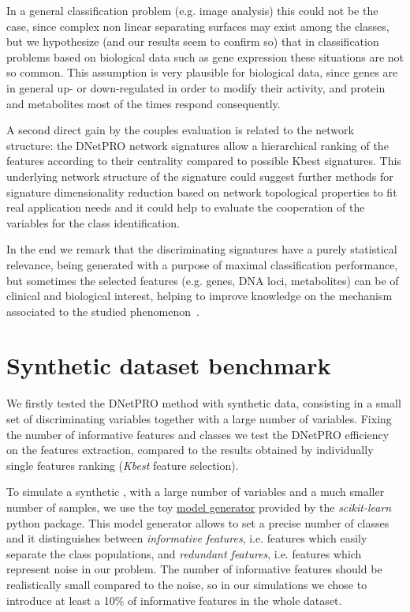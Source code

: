 \documentclass{standalone}
\begin{document}
In a general classification problem (e.g. image analysis) this could not be the case, since complex non linear separating surfaces may exist among the classes, but we hypothesize (and our results seem to confirm so) that in classification problems based on biological data such as gene expression these situations are not so common.
This assumption is very plausible for biological data, since genes are in general up- or down-regulated in order to modify their activity, and protein and metabolites most of the times respond consequently.

A second direct gain by the couples evaluation is related to the network structure: the DNetPRO network signatures allow a hierarchical ranking of the features according to their centrality compared to possible Kbest signatures.
This underlying network structure of the signature could suggest further methods for signature dimensionality reduction based on network topological properties to fit real application needs and it could help to evaluate the cooperation of the variables for the class identification.

In the end we remark that the discriminating signatures have a purely statistical relevance, being generated with a purpose of maximal classification performance, but sometimes the selected features (e.g. genes, DNA loci, metabolites) can be of clinical and biological interest, helping to improve knowledge on the mechanism associated to the studied phenomenon~\cite{PMrna, Scotlandi2009, PMgene, Terragna}.



\section[Toy Model]{Synthetic dataset benchmark}\label{toy}

We firstly tested the DNetPRO method with synthetic data, consisting in a small set of discriminating variables together with a large number of  variables.
Fixing the number of informative features and classes we test the DNetPRO efficiency on the features extraction, compared to the results obtained by individually single features ranking (\emph{Kbest} feature selection).

To simulate a synthetic , with a large number of variables and a much smaller number of samples, we use the toy \href{https://scikit-learn.org/stable/modules/generated/sklearn.datasets.make_classification.html}{model generator} provided by the \emph{scikit-learn}~\cite{scikit-learn} python package.
This model generator allows to set a precise number of classes and it distinguishes between \emph{informative features}, i.e. features which easily separate the class populations, and \emph{redundant features}, i.e. features which represent noise in our problem.
The number of informative features should be realistically small compared to the noise, so in our simulations we chose to introduce at least a 10\% of informative features in the whole dataset.


\end{document}
